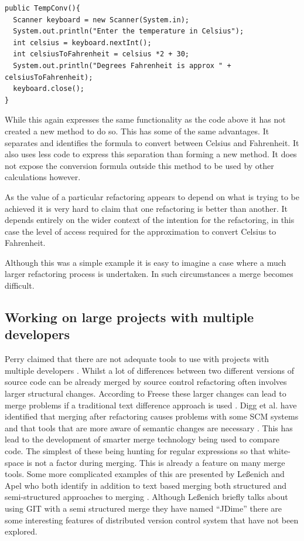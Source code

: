 \documentclass[12pt]{CRPITStyle}
\renewcommand{\cite}{\citep}
\begin{document}
\begin{verbatim}
public TempConv(){
  Scanner keyboard = new Scanner(System.in);
  System.out.println("Enter the temperature in Celsius");
  int celsius = keyboard.nextInt();
  int celsiusToFahrenheit = celsius *2 + 30;
  System.out.println("Degrees Fahrenheit is approx " + celsiusToFahrenheit);
  keyboard.close();
}
\end{verbatim}

While this again expresses the same functionality as the code above it has not created a new method to do so. This has some of the same advantages. It separates and identifies the formula to convert between Celsius and Fahrenheit. It also uses less code to express this separation than forming a new method. It does not expose the conversion formula outside this method to be used by other calculations however.

As the value of a particular refactoring appears to depend on what is trying to be achieved it is very hard to claim that one refactoring is better than another. It depends entirely on the wider context of the intention for the refactoring, in this case the level of access required for the approximation to convert Celsius to Fahrenheit.

Although this was a simple example it is easy to imagine a case where a much larger refactoring process is undertaken. In such circumstances a merge becomes difficult. 
\subsection{Working on large projects with multiple developers}
Perry claimed that there are not adequate tools to use with projects with multiple developers \cite{Perry2001} . Whilst a lot of differences between two different versions of source code can be already merged by source control refactoring often involves larger structural changes. According to Freese these larger changes can lead to merge problems if a traditional text difference approach is used \cite{freese2007operation}. Digg et al. have identified that merging after refactoring causes problems with some SCM systems and that tools that are more aware of semantic changes are necessary \cite{Dig2008}. This has lead to the development of smarter merge technology being used to compare code. The simplest of these being hunting for regular expressions so that white-space is not a factor during merging. This is already a feature on many merge tools. Some more complicated examples of this are presented by Le{\ss}enich and Apel who both identify in addition to text based merging both structured and semi-structured approaches to merging \cite{LeBenich2012} \cite{Apel2011}. Although Le{\ss}enich briefly talks about using GIT with a semi structured merge they have named ``JDime'' there are some interesting features of distributed version control system that have not been explored.
\end{document}

